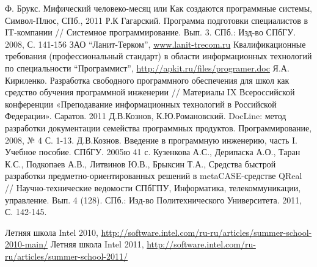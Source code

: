\documentclass[a5paper]{article}
\begin{document}
\begin{thebibliography}{9001}
   Ф. Брукс. Мифический человеко-месяц или Как создаются программные системы, Символ-Плюс, СПб., 2011
   Р.К Гагарский. Программа подготовки специалистов в IT-компании // Системное программирование. Вып. 3. СПб.: Изд-во СПбГУ. 2008, С. 141-156
   ЗАО ``Ланит-Терком'', \url{www.lanit-trecom.ru}
   Квалификационные требования (профессиональный стандарт) в области информационных технологий по специальности ``Программист'', \url{http://apkit.ru/files/programer.doc}
   Я.А. Кириленко. Разработка свободного программного обеспечения для школ как средство обучения программной инженерии // Материалы IX Всероссийской конференции «Преподавание информационных технологий в Российской Федерации». Саратов. 2011
   Д.В.Кознов, К.Ю.Романовский.  DocLine: метод разработки документации семейства программных продуктов. Программирование, 2008, № 4 С. 1-13.
   Д.В.Кознов. Введение в программную инженерию, часть I. Учебное пособие. СПбГУ. 2005ю 41 с. 
   Кузенкова А.С., Дерипаска А.О., Таран К.С., Подкопаев А.В., Литвинов Ю.В., Брыксин Т.А., Средства быстрой разработки предметно-ориентированных решений в metaCASE-средстве QReal // Научно-технические ведомости СПбГПУ, Информатика, телекоммуникации, управление. Вып. 4 (128). СПб.: Изд-во Политехнического Университета. 2011, С. 142-145.

   Летняя школа Intel 2010, \url{http://software.intel.com/ru-ru/articles/summer-school-2010-main/}
   Летняя школа Intel 2011, \url{http://software.intel.com/ru-ru/articles/summer-school-2011/}


\end{thebibliography}
\end{document}
